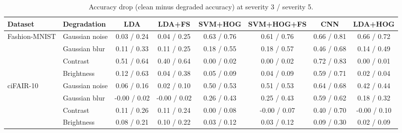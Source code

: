 \begin{table}[t]
\centering
\caption{Accuracy drop (clean minus degraded accuracy) at severity 3 / severity 5.}
\label{tab:drop}
\small
\begin{tabular}{llcccccc}
\toprule
Dataset & Degradation & LDA & LDA+FS & SVM+HOG & SVM+HOG+FS & CNN & LDA+HOG \\
\midrule
Fashion-MNIST & Gaussian noise & 0.03 / 0.24 & 0.04 / 0.25 & 0.63 / 0.76 & 0.61 / 0.76 & 0.66 / 0.81 & 0.66 / 0.72 \\
 & Gaussian blur & 0.11 / 0.33 & 0.11 / 0.25 & 0.18 / 0.55 & 0.18 / 0.57 & 0.46 / 0.68 & 0.14 / 0.49 \\
 & Contrast & 0.51 / 0.64 & 0.40 / 0.64 & 0.00 / 0.02 & 0.00 / 0.02 & 0.72 / 0.83 & 0.00 / 0.01 \\
 & Brightness & 0.12 / 0.63 & 0.04 / 0.38 & 0.05 / 0.09 & 0.04 / 0.09 & 0.59 / 0.71 & 0.02 / 0.04 \\
\midrule
ciFAIR-10 & Gaussian noise & 0.06 / 0.16 & 0.02 / 0.10 & 0.50 / 0.53 & 0.51 / 0.53 & 0.64 / 0.68 & 0.42 / 0.44 \\
 & Gaussian blur & -0.00 / 0.02 & -0.00 / 0.02 & 0.26 / 0.43 & 0.25 / 0.43 & 0.59 / 0.62 & 0.18 / 0.32 \\
 & Contrast & 0.11 / 0.26 & 0.11 / 0.24 & 0.00 / 0.08 & -0.00 / 0.07 & 0.40 / 0.70 & -0.00 / 0.10 \\
 & Brightness & 0.08 / 0.21 & 0.10 / 0.22 & 0.03 / 0.12 & 0.03 / 0.12 & 0.09 / 0.30 & 0.02 / 0.09 \\
\bottomrule
\end{tabular}
\end{table}
